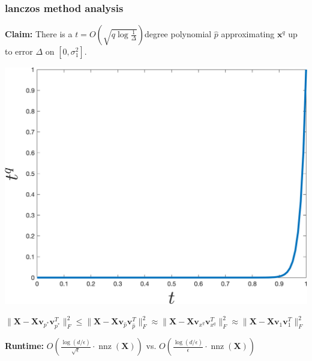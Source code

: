 \documentclass[compress]{beamer}
\newcommand{\bv}[1]{\mathbf{#1}}
\DeclareMathOperator{\nnz}{nnz}
\begin{document}
%	
%	
%	
%
\begin{frame}[t]
	\frametitle{lanczos method analysis}
	\textbf{Claim:} There is a $t = O\left(\sqrt{q\log\frac{1}{\Delta}}\right)$degree polynomial $\hat{p}$ approximating $\bv{x}^q$ up to error $\Delta$ on $[0,\sigma_1^2]$.
	\begin{center}
		\includegraphics[width=.4\textwidth]{basic_jump.png} 
	\end{center}
	
	$\|\bv{X} - \bv{X}\bv{v}_{{p}^*}\bv{v}_{{p}^*}^T\|_F^2 \leq \|\bv{X} - \bv{X}\bv{v}_{\hat{p}}\bv{v}_{\hat{p}}^T\|_F^2 \approx \|\bv{X} - \bv{X}\bv{v}_{x^q}\bv{v}_{x^q}^T\|_F^2 \approx \|\bv{X} - \bv{X}\bv{v}_1\bv{v}_1^{T}\|_F^2$
	
	\textbf{\alert{Runtime}:} $O\left(\frac{\log(d/\epsilon)}{\sqrt{\epsilon}} \cdot \nnz(\bv{X})\right)$ vs. $O\left({\frac{\log(d/\epsilon)}{\epsilon}} \cdot \nnz(\bv{X})\right)$ 
\end{frame}
\end{document}
